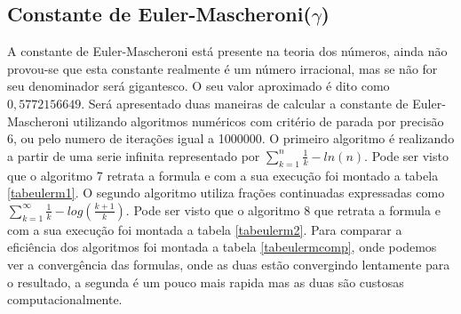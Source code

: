 \documentclass[12pt]{article}
\begin{document}
\newpage{}

\subsection{Constante de Euler-Mascheroni($\gamma$)}
A constante de Euler-Mascheroni está presente na teoria dos números, ainda não provou-se que esta constante realmente é um número irracional, mas se não for seu denominador será gigantesco. O seu valor aproximado é dito como $0,5772156649$.
Será apresentado duas maneiras de calcular a constante de Euler-Mascheroni utilizando algoritmos numéricos com critério de parada por precisão 6, ou pelo numero de iterações igual a 1000000. O primeiro algoritmo é realizando a partir de uma serie infinita representado por $\sum\limits_{k=1}^{n} \frac{1}{k} - ln(n)$\cite{EulerM}. Pode ser visto que o algoritmo 7 retrata a formula e com a sua execução foi montado a tabela \ref{tabeulerm1}. O segundo algoritmo utiliza frações continuadas expressadas como $\sum\limits_{k=1}^{\infty} \frac{1}{k} - log(\frac{k+1}{k})$\cite{eulerm2}. Pode ser visto que o algoritmo 8 que retrata a formula e com a sua execução foi montada a tabela \ref{tabeulerm2}. Para comparar a eficiência dos algoritmos foi montada a tabela \ref{tabeulermcomp}, onde podemos ver a convergência das formulas, onde as duas estão convergindo lentamente para o resultado, a segunda é um pouco mais rapida mas as duas são custosas computacionalmente.

\newpage{}
\end{document}
